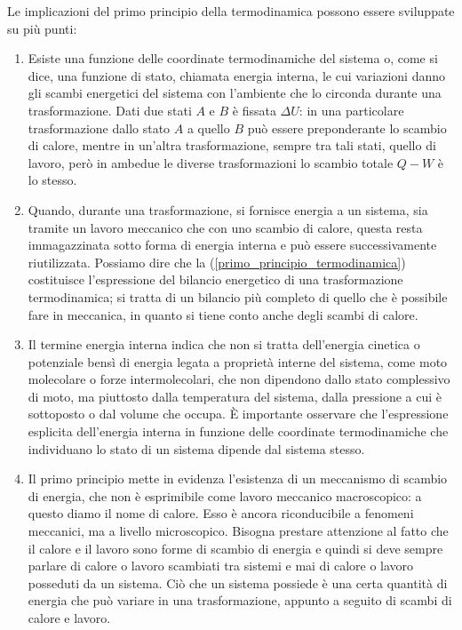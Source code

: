 \documentclass[class=book, crop=false, oneside, 12pt]{standalone}
\begin{document}
Le implicazioni del primo principio della termodinamica possono essere sviluppate su più punti:
\begin{enumerate}
    \item Esiste una funzione delle coordinate termodinamiche del sistema o, come si dice, una funzione di stato, chiamata energia interna, le cui variazioni danno gli scambi energetici del sistema con l'ambiente che lo circonda durante una trasformazione. 
    Dati due stati \(A\) e \(B\) è fissata \(\Delta U\): in una particolare trasformazione dallo stato \(A\) a quello \(B\) può essere preponderante lo scambio di calore, mentre in un'altra trasformazione, sempre tra tali stati, quello di lavoro, però in ambedue le diverse trasformazioni lo scambio totale \(Q - W\) è lo stesso. 
    \item Quando, durante una trasformazione, si fornisce energia a un sistema, sia tramite un lavoro meccanico che con uno scambio di calore, questa resta immagazzinata sotto forma di energia interna e può essere successivamente riutilizzata.
    Possiamo dire che la (\ref{primo_principio_termodinamica}) costituisce l'espressione del bilancio energetico di una trasformazione termodinamica; si tratta di un bilancio più completo di quello che è possibile fare in meccanica, in quanto si tiene conto anche degli scambi di calore.
    \item Il termine energia interna indica che non si tratta dell'energia cinetica o potenziale bensì di energia legata a proprietà interne del sistema, come moto molecolare o forze intermolecolari, che non dipendono dallo stato complessivo di moto, ma piuttosto dalla temperatura del sistema, dalla pressione a cui è sottoposto o dal volume che occupa. 
    È importante osservare che l'espressione esplicita dell'energia interna in funzione delle coordinate termodinamiche che individuano lo stato di un sistema dipende dal sistema stesso.
    \item Il primo principio mette in evidenza l'esistenza di un meccanismo di scambio di energia, che non è esprimibile come lavoro meccanico macroscopico: a questo diamo il nome di calore. 
    Esso è ancora riconducibile a fenomeni meccanici, ma a livello microscopico.
    Bisogna prestare attenzione al fatto che il calore e il lavoro sono forme di scambio di energia e quindi si deve sempre parlare di calore o lavoro scambiati tra sistemi e mai di calore o lavoro posseduti da un sistema. 
    Ciò che un sistema possiede è una certa quantità di energia che può variare in una trasformazione, appunto a seguito di scambi di calore e lavoro.

\end{enumerate}
\end{document}
